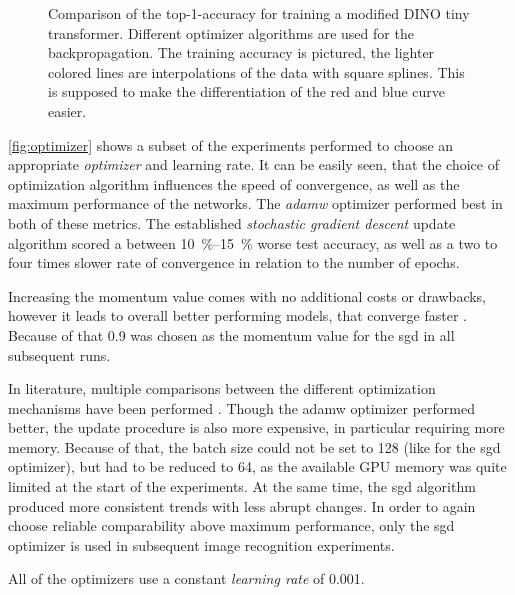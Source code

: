 \begin{figure}[htbp]
    \centering
    \caption{Comparison of the top-1-accuracy for training a modified DINO tiny transformer.
    Different optimizer algorithms are used for the backpropagation.
    The training accuracy is pictured, the lighter colored lines are interpolations of the data with square splines. 
    This is supposed to make the differentiation of the red and blue curve easier.
    }
    \label{fig:optimizer}
\end{figure}

\autoref{fig:optimizer} shows a subset of the experiments performed to choose an appropriate \emph{optimizer} and learning rate.
It can be easily seen, that the choice of optimization algorithm influences the speed of convergence, as well as the maximum performance of the networks.
The \emph{adamw} \cite{adamwOptimizer} optimizer performed best in both of these metrics.
The established \emph{stochastic gradient descent} update algorithm scored a between \SIrange[]{10}{15}{\percent} worse test accuracy, as well as a two to four times slower rate of convergence in relation to the number of epochs.

Increasing the momentum value comes with no additional costs or drawbacks, however it leads to overall better performing models, that converge faster \cite{momentum}.
Because of that \SI{0.9}{} was chosen as the momentum value for the sgd in all subsequent runs.

In literature, multiple comparisons between the different optimization mechanisms have been performed \cite{sgdOrAdamw}.
Though the adamw optimizer performed better, the update procedure is also more expensive, in particular requiring more memory.
Because of that, the batch size could not be set to 128 (like for the sgd optimizer), but had to be reduced to 64, as the available GPU memory was quite limited at the start of the experiments.
At the same time, the sgd algorithm produced more consistent trends with less abrupt changes.
In order to again choose reliable comparability above maximum performance, only the sgd optimizer is used in subsequent image recognition experiments. 

All of the optimizers use a constant \emph{learning rate} of \SI[]{0.001}{}{}.